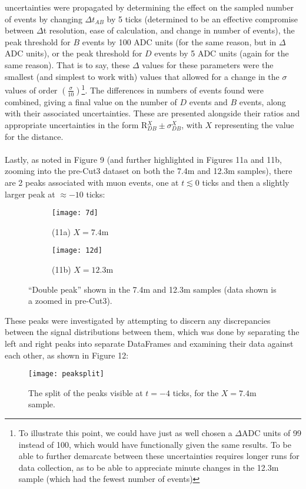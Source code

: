 \documentclass[a4paper]{article}
\begin{document}
uncertainties were propagated by determining the effect on the sampled number of events by changing $\Delta t_{AB}$ by 5 ticks (determined to be an effective compromise between $\Delta$t resolution, ease of calculation, and change in number of events),
the peak threshold for $B$ events by 100 ADC units (for the same reason, but in $\Delta$ADC units), or the peak threshold for $D$ events by 5 ADC units (again for the same reason). That is to say, these $\Delta$ values for these parameters were the smallest (and simplest to work with) values that allowed for a change in the $\sigma$ values of order $\left( \frac{\sigma}{10} \right)$\footnote{To illustrate this point, we could have just as well chosen a $\Delta$ADC units of 99 instead of 100, which would have functionally given the same results. To be able to further demarcate between these uncertainties requires longer runs for data collection, as to be able to appreciate minute changes in the 12.3m sample (which had the fewest number of events)}.
The differences in numbers of events found were combined, giving a final value on the number of $D$ events and $B$ events, along with their associated uncertainties. 
These are presented alongside their ratios and appropriate uncertainties in the form R$^{X}_{DB} \pm \sigma^{X}_{DB}$, with $X$ representing the value for the distance.
\\\\
Lastly, as noted in Figure 9 (and further highlighted in Figures 11a and 11b, zooming into the pre-Cut3 dataset on both the 7.4m and 12.3m samples), there are 2 peaks associated with muon events, one at $t \lesssim 0$ ticks and then a slightly larger peak at $\approx -10$ ticks:
\begin{figure}[h!]
\centering
	 \begin{subfigure}[t!]{0.5\textwidth}
		 \centering
		 \texttt{[image: 7d]}
		 \caption*{(11a) $X=7.4$m}
	 \end{subfigure}
	 \hfill
	 \begin{subfigure}[t!]{0.5\textwidth}
		 \centering
		 \texttt{[image: 12d]}
		 \caption*{(11b) $X=12.3$m}
	 \end{subfigure}
	 \caption{``Double peak'' shown in the 7.4m and 12.3m samples (data shown is a zoomed in pre-Cut3).}
\end{figure}
\newpage \noindent
These peaks were investigated by attempting to discern any discrepancies between the signal distributions between them, which was done by separating the left and right peaks into separate DataFrames and examining their data against each other, as shown in Figure 12:
\begin{figure}[h!]
\begin{center}
	\texttt{[image: peaksplit]}
\end{center}
\caption{The split of the peaks visible at $t=-4$ ticks, for the $X=7.4$m sample.}
\end{figure}
\newpage
\end{document}

